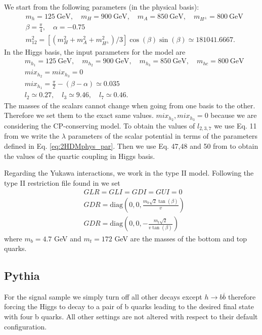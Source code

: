 We start from the following parameters (in the physical basis):
\begin{align}
	&m_h=125 ~\text{GeV}, \quad m_H=900 ~\text{GeV},\quad m_A=850 ~\text{GeV}, \quad m_{H^{\pm}}=800 ~\text{GeV} \nonumber \\
	&\beta=\frac{\pi}{4}, \quad \alpha = -0.75\nonumber \\	 
	&m_{12}^2=[(m_H^2+m_A^2+m_{H^{\pm}}^2)/3] \cos(\beta)\sin(\beta)\simeq181041.6667.
	\label{eq:2HDMphys_par}
\end{align}
In the Higgs basis, the input parameters for the model are
\begin{align}
&m_{h_1}=125 ~\text{GeV}, \quad m_{h_2}=900 ~\text{GeV},\quad m_{h_3}=850 ~\text{GeV}, \quad m_{hc}=800 ~\text{GeV} \nonumber \\
&mix_{h_2}=mix_{h_3} =0 \nonumber \\
&mix_{h_1}=\frac{\pi}{2}-(\beta-\alpha)\simeq 0.035 \nonumber \\
&l_2\simeq 0.27, \quad l_3\simeq 9.46, \quad l_7\simeq 0.46.
\label{eq:2HDMhiggs_par}
\end{align}
The masses of the scalars cannot change when going from one basis to the other. Therefore we set them to the exact same values. $mix_{h_2},mix_{h_3}=0$ because we are considering the CP-conserving model.
To obtain the values of $l_{2,3,7}$ we use Eq. 11 from \cite{2HDMpedro} we write the $\lambda$ parameters of the scalar potential in terms of the parameters defined in Eq. \ref{eq:2HDMphys_par}. Then we use Eq. 47,48 and 50 from \cite{2HDMhaber} to obtain the values of the quartic coupling in Higgs basis.

Regarding the Yukawa interactions, we work in the type II model. Following the type II restriction file found in \cite{2HDM} we set
\begin{align}
	&GLR=GLI=GDI=GUI=0 \nonumber \\
	&GDR=\text{diag}\left(0,0,\frac{m_b\sqrt{2}\tan(\beta)}{v}\right) \nonumber \\
	&GDR=\text{diag}\left(0,0,-\frac{m_t\sqrt{2}}{v\tan(\beta)}\right)
\end{align}	
where $m_b=4.7$ GeV and $m_t=172$ GeV are the masses of the bottom and top quarks.

\subsection{Pythia}

For the signal sample we simply turn off all other decays except $h\rightarrow b\overline{b}$ therefore forcing the Higgs to decay to a pair of b quarks leading to the desired final state with four b quarks. All other settings are not altered with respect to their default configuration.

